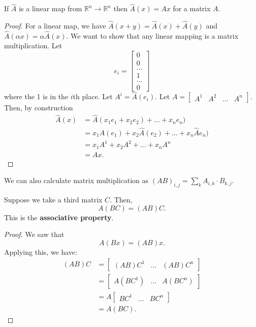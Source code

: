 \begin{theorem}
	If \( \hat{A} \) is a linear map from \( \mathbb{R}^{n} \to  \mathbb{R}^{n}   \) then \( \hat{A}(x) = Ax \) for a matrix \( A \).
\end{theorem}
\begin{proof}
	For a linear map, we have \( \hat{A}(x+y) = \hat{A}(x) + \hat{A}(y) \) and \( \hat{A}(\alpha x) = \alpha \hat{A}(x) \). We want to show that any linear mapping is a matrix multiplication. Let \[ e_i = \begin{bmatrix}
		0 \\ 0 \\ \ldots \\ 1 \\ \ldots \\ 0
	\end{bmatrix}\] where the 1 is in the \( i\)th place. Let \( A^{i}=\hat{A}(e_i)  \). Let \( A = \begin{bmatrix}
	A^{1} & A^{2} & \ldots  & A^{n} 
	\end{bmatrix} \). Then, by construction 
	\begin{align*}
		\hat{A}(x)&=\hat{A}(x_{1}e_{1} + x_{2}e_{2}) + \ldots  + x_ne_n ) \\ &= x_{1}\hat{A}(e_{1}) + x_{2}\hat{A}(e_{2}) + \ldots + x_n \hat{A}e_n)\\ &= x_{1}A^{1} + x_{2}A^{2} + \ldots  + x_nA^{n}\\  &= Ax
	.\end{align*}
\end{proof}

We can also calculate matrix multiplication as \( (AB)_{i,j} = \sum_k A_{i,k} \cdot B_{k,j}  \).

\begin{theorem}
	Suppose we take a third matrix \( C \). Then, \[
		A(BC) = (AB)C
	.\] This is the \textbf{associative property}.
\end{theorem}
\begin{proof}
	We saw that \[
		A(Bx) = (AB)x
	.\] Applying this, we have:
	\begin{align*}
		(AB)C &= \begin{bmatrix}
			(AB)C^{1} & \ldots & (AB)C^{n}  
		\end{bmatrix} \\
		&= \begin{bmatrix}
			A(BC^{1} ) & \ldots & A(BC^{n} )
		\end{bmatrix} \\
		&= A \begin{bmatrix}
			BC^{1} & \ldots & BC^{n}  
		\end{bmatrix}\\
		&= A(BC)
	.\end{align*}
\end{proof}


